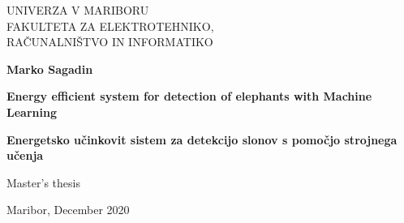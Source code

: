 \begin{titlepage}
    \begin{center}
 
        \fontsize{16}{26}
        \selectfont
        UNIVERZA V MARIBORU\\
        FAKULTETA ZA ELEKTROTEHNIKO,\\
        RAČUNALNIŠTVO IN INFORMATIKO
        \vspace*{3.0cm}

        \textbf{Marko Sagadin}

        \vspace{0.5cm}

        \fontsize{26}{26}
        \selectfont
        \textbf{Energy efficient system for detection of elephants with Machine Learning}
 
        \vspace{1.0cm}

        \fontsize{26}{26}
        \selectfont
        \textbf{Energetsko učinkovit sistem za detekcijo slonov s pomočjo strojnega učenja}

        \vspace{0.5cm}

        \fontsize{16}{18}
        \selectfont
        Master's thesis
 
        \vspace*{\fill}

        Maribor, December 2020 
 
 
    \end{center}
\end{titlepage}
